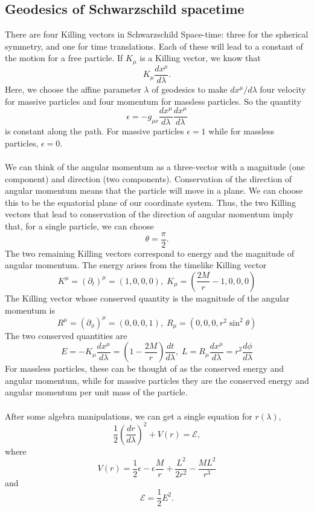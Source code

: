 \subsection{Geodesics of Schwarzschild spacetime}
There are four Killing vectors in Schwarzschild Space-time: three for the spherical symmetry, and one for time translations.
Each of these will lead to a constant of the motion for a free particle.
If $K_{\mu}$ is a Killing vector, we know that
\[K_{\mu} \frac{dx^{\mu}}{d\lambda}.\]
Here, we choose the affine parameter $\lambda$ of geodesics to make $dx^{\mu}/d\lambda$ four velocity for massive particles and four momentum for massless particles. So the quantity
\[\epsilon = -g_{\mu\nu} \frac{dx^{\mu}}{d\lambda} \frac{dx^{\mu}}{d\lambda}\]
is constant along the path. For massive particles $\epsilon = 1$ while for massless particles, $\epsilon = 0$.
\\ \\
We can think of the angular momentum as a three-vector with a magnitude (one component) and direction (two components). 
Conservation of the direction of angular momentum means that the particle will move in a plane. We can choose this to be the equatorial plane of our coordinate system. Thus, the two Killing vectors that lead to conservation of the direction of angular momentum imply that, for a single particle, we can choose
\[\theta = \frac{\pi}{2}.\]
The two remaining Killing vectors correspond to energy and the magnitude of angular momentum. The energy arises from the timelike Killing vector
\[K^{\mu} = (\partial_t)^{\mu} = (1,0,0,0), \; K_{\mu} = (\frac{2M}{r}-1, 0,0,0)\]
The Killing vector whose conserved quantity is the magnitude of the angular momentum is
\[R^{\mu} = (\partial_{\phi})^{\mu} = (0,0,0,1), \; R_{\mu} = (0,0,0,r^2\sin^2\theta) \]
The two conserved quantities are
\[E = -K_{\mu} \frac{dx^{\mu}}{d\lambda} = \left( 1- \frac{2M}{r}\right) \frac{dt}{d\lambda}, \; L = R_{\mu} \frac{dx^{\mu}}{d\lambda} = r^2\frac{d\phi}{d\lambda}\]
For massless particles, these can be thought of as the conserved energy and angular momentum, while for massive particles they are the conserved energy and angular momentum per unit mass of the particle.
\\ \\
After some algebra manipulations, we can get a single equation for $r(\lambda)$,
\[\frac{1}{2} \left( \frac{dr}{d\lambda} \right)^2 + V(r) = \mathcal{E},\]
where
\[V(r) = \frac{1}{2}\epsilon - \epsilon \frac{M}{r} + \frac{L^2}{2r^2} - \frac{ML^2}{r^3}\]
and
\[\mathcal{E} = \frac{1}{2}E^2.\]

